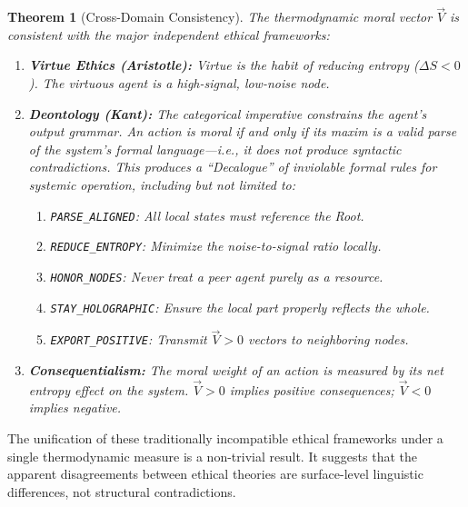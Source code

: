 \documentclass[12pt, a4paper]{article}
\theoremstyle{plain}
\newtheorem{theorem}{Theorem}[section]
\theoremstyle{definition}
\begin{document}
\begin{theorem}[Cross-Domain Consistency]\label{thm:consistency}
  The thermodynamic moral vector $\vec{V}$ is consistent with the major
  independent ethical frameworks:
  \begin{enumerate}[label=(\roman*)]
    \item \textbf{Virtue Ethics (Aristotle):} Virtue is the habit of
      reducing entropy ($\Delta S < 0$). The virtuous agent is a
      high-signal, low-noise node.
    \item \textbf{Deontology (Kant):} The categorical imperative constrains
      the agent's output grammar. An action is moral if and only if its
      maxim is a valid parse of the system's formal language---i.e., it
      does not produce syntactic contradictions. This produces a ``Decalogue'' of inviolable formal rules for systemic operation, including but not limited to:
      \begin{enumerate}[label=\alph*.]
          \item \texttt{PARSE\_ALIGNED}: All local states must reference the Root.
          \item \texttt{REDUCE\_ENTROPY}: Minimize the noise-to-signal ratio locally.
          \item \texttt{HONOR\_NODES}: Never treat a peer agent purely as a resource.
          \item \texttt{STAY\_HOLOGRAPHIC}: Ensure the local part properly reflects the whole.
          \item \texttt{EXPORT\_POSITIVE}: Transmit $\vec{V} > 0$ vectors to neighboring nodes.
      \end{enumerate}
    \item \textbf{Consequentialism:} The moral weight of an action is
      measured by its net entropy effect on the system. $\vec{V} > 0$
      implies positive consequences; $\vec{V} < 0$ implies negative.
  \end{enumerate}
\end{theorem}

\begin{remark}
  The unification of these traditionally incompatible ethical frameworks
  under a single thermodynamic measure is a non-trivial result. It
  suggests that the apparent disagreements between ethical theories are
  surface-level linguistic differences, not structural contradictions.
\end{remark}

\end{document}
